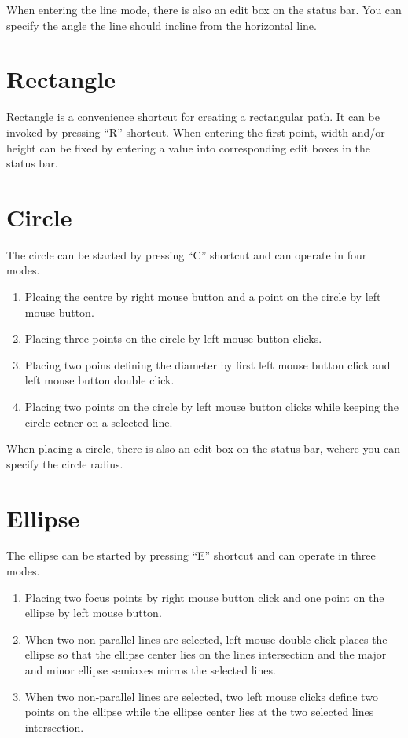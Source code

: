 When entering the line mode, there is also an edit box on the status bar. You can
specify the angle the line should incline from the horizontal line.

\section{Rectangle}\label{draw:rect}

Rectangle is a convenience shortcut for creating a rectangular path. It can be invoked
by pressing ``R'' shortcut. When entering the first point, width and/or height can be
fixed by entering a value into corresponding edit boxes in the status bar.

\section{Circle}

The circle can be started by pressing ``C'' shortcut and can operate in four modes.
\begin{enumerate}
\item Plcaing the centre by right mouse button and a point on the circle by left
mouse button.
\item Placing three points on the circle by left mouse button clicks.
\item Placing two poins defining the diameter by first left mouse button click and
left mouse button double click.
\item Placing two points on the circle by left mouse button clicks while keeping
the circle cetner on a selected line.
\end{enumerate}

When placing a circle, there is also an edit box on the status bar, wehere you can
specify the circle radius.

\section{Ellipse}

The ellipse can be started by pressing ``E'' shortcut and can operate in three modes.
\begin{enumerate}
\item Placing two focus points by right mouse button click and one point on the ellipse
by left mouse button.
\item When two non-parallel lines are selected, left mouse double click places the ellipse
so that the ellipse center lies on the lines intersection and the major and minor ellipse
semiaxes mirros the selected lines.
\item When two non-parallel lines are selected, two left mouse clicks define two points
on the ellipse while the ellipse center lies at the two selected lines intersection.
\end{enumerate}

